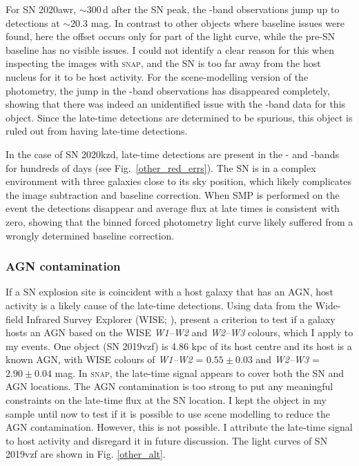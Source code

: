 \documentclass[a4paper,oneside,12pt, class=Latex/Classes/PhDthesisPSnPDF, crop=false]{standalone}
\begin{document}
For SN 2020awr, $\sim$300\,d after the SN peak, the \ztfi-band observations jump up to detections at $\sim$20.3 mag. In contrast to other objects where baseline issues were found, here the offset occurs only for part of the light curve, while the pre-SN baseline has no visible issues. I could not identify a clear reason for this when inspecting the images with \textsc{snap}, and the SN is too far away from the host nucleus for it to be host activity. For the scene-modelling version of the photometry, the jump in the \ztfi-band observations has disappeared completely, showing that there was indeed an unidentified issue with the \ztfi-band data for this object. Since the late-time detections are determined to be spurious, this object is ruled out from having late-time detections.

In the case of SN 2020kzd, late-time detections are present in the \ztfg- and \ztfr-bands for hundreds of days (see Fig.~\ref{other_red_errs}). The SN is in a complex environment with three galaxies close to its sky position, which likely complicates the image subtraction and baseline correction. When SMP is performed on the event the detections disappear and average flux at late times is consistent with zero, showing that the binned forced photometry light curve likely suffered from a wrongly determined baseline correction.

\subsubsection{AGN contamination}
\label{sec:agn_cont}
If a SN explosion site is coincident with a host galaxy that has an AGN, host activity is a likely cause of the late-time detections. Using data from the Wide-field Infrared Survey Explorer (WISE; \citealt{WISE}), \citet{WISE_crit} present a criterion to test if a galaxy hosts an AGN based on the WISE \textit{W1--W2} and \textit{W2--W3} colours, which I apply to my events. One object (SN 2019vzf) is 4.86 kpc of its host centre and its host is a known AGN, with WISE colours of \textit{W1--W2} = $0.55\pm0.03$ and \textit{W2--W3} = $2.90\pm0.04$ mag. In \textsc{snap}, the late-time signal appears to cover both the SN and AGN locations. The AGN contamination is too strong to put any meaningful constraints on the late-time flux at the SN location. I kept the object in my sample until now to test if it is possible to use scene modelling to reduce the AGN contamination. However, this is not possible. I attribute the late-time signal to host activity and disregard it in future discussion. The light curves of SN 2019vzf are shown in Fig. \ref{other_alt}.
\end{document}
